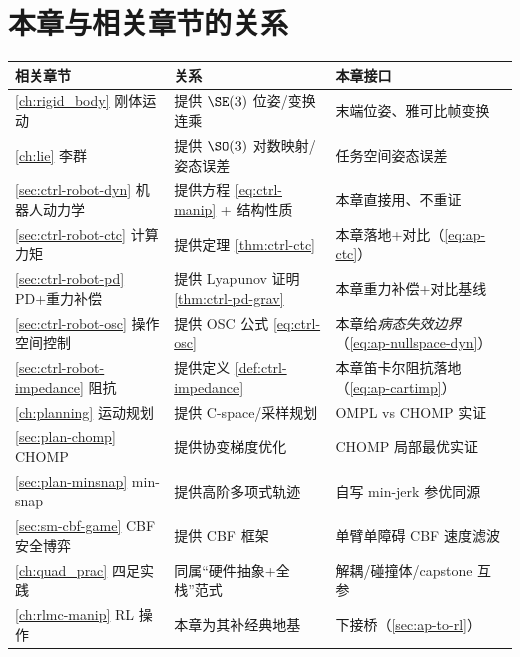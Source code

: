 \section*{本章与相关章节的关系}
\begin{table}[H]\centering\small
\begin{tabular}{lll}
\toprule
相关章节 & 关系 & 本章接口 \\
\midrule
\cref{ch:rigid_body} 刚体运动 & 提供 $\SE(3)$ 位姿/变换连乘 & 末端位姿、雅可比帧变换 \\
\cref{ch:lie} 李群 & 提供 $\SO(3)$ 对数映射/姿态误差 & 任务空间姿态误差 \\
\cref{sec:ctrl-robot-dyn} 机器人动力学 & 提供方程 \cref{eq:ctrl-manip} + 结构性质 & 本章直接用、不重证 \\
\cref{sec:ctrl-robot-ctc} 计算力矩 & 提供定理 \cref{thm:ctrl-ctc} & 本章落地+对比（\cref{eq:ap-ctc}）\\
\cref{sec:ctrl-robot-pd} PD+重力补偿 & 提供 Lyapunov 证明 \cref{thm:ctrl-pd-grav} & 本章重力补偿+对比基线 \\
\cref{sec:ctrl-robot-osc} 操作空间控制 & 提供 OSC 公式 \cref{eq:ctrl-osc} & 本章给\emph{病态失效边界}（\cref{eq:ap-nullspace-dyn}）\\
\cref{sec:ctrl-robot-impedance} 阻抗 & 提供定义 \cref{def:ctrl-impedance} & 本章笛卡尔阻抗落地（\cref{eq:ap-cartimp}）\\
\cref{ch:planning} 运动规划 & 提供 C-space/采样规划 & OMPL vs CHOMP 实证 \\
\cref{sec:plan-chomp} CHOMP & 提供协变梯度优化 & CHOMP 局部最优实证 \\
\cref{sec:plan-minsnap} min-snap & 提供高阶多项式轨迹 & 自写 min-jerk 参优同源 \\
\cref{sec:sm-cbf-game} CBF 安全博弈 & 提供 CBF 框架 & 单臂单障碍 CBF 速度滤波 \\
\cref{ch:quad_prac} 四足实践 & 同属“硬件抽象+全栈”范式 & 解耦/碰撞体/capstone 互参 \\
\cref{ch:rlmc-manip} RL 操作 & 本章为其补经典地基 & 下接桥（\cref{sec:ap-to-rl}）\\
\bottomrule
\end{tabular}
\end{table}

